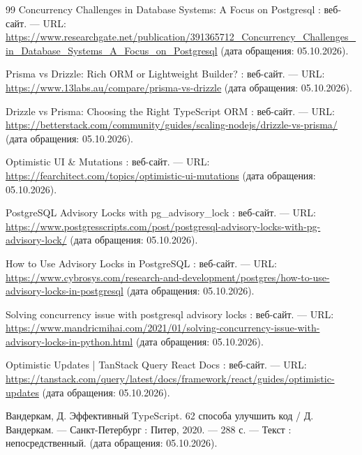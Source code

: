 \documentclass[a4paper,14pt]{extreport}
\begin{document}
\begin{thebibliography}{99}
 Concurrency Challenges in Database Systems: A Focus on Postgresql : веб-сайт. --- URL: \url{https://www.researchgate.net/publication/391365712_Concurrency_Challenges_in_Database_Systems_A_Focus_on_Postgresql} (дата обращения: 05.10.2026).

 Prisma vs Drizzle: Rich ORM or Lightweight Builder? : веб-сайт. --- URL: \url{https://www.13labs.au/compare/prisma-vs-drizzle} (дата обращения: 05.10.2026).

 Drizzle vs Prisma: Choosing the Right TypeScript ORM : веб-сайт. --- URL: \url{https://betterstack.com/community/guides/scaling-nodejs/drizzle-vs-prisma/} (дата обращения: 05.10.2026).

 Optimistic UI \& Mutations : веб-сайт. --- URL: \url{https://fearchitect.com/topics/optimistic-ui-mutations} (дата обращения: 05.10.2026).

 PostgreSQL Advisory Locks with pg\_advisory\_lock : веб-сайт. --- URL: \url{https://www.postgresscripts.com/post/postgresql-advisory-locks-with-pg-advisory-lock/} (дата обращения: 05.10.2026).

 How to Use Advisory Locks in PostgreSQL : веб-сайт. --- URL: \url{https://www.cybrosys.com/research-and-development/postgres/how-to-use-advisory-locks-in-postgresql} (дата обращения: 05.10.2026).

 Solving concurrency issue with postgresql advisory locks : веб-сайт. --- URL: \url{https://www.mandricmihai.com/2021/01/solving-concurrency-issue-with-advisory-locks-in-python.html} (дата обращения: 05.10.2026).

 Optimistic Updates | TanStack Query React Docs : веб-сайт. --- URL: \url{https://tanstack.com/query/latest/docs/framework/react/guides/optimistic-updates} (дата обращения: 05.10.2026).

 Вандеркам, Д. Эффективный TypeScript. 62 способа улучшить код / Д. Вандеркам. — Санкт-Петербург : Питер, 2020. — 288 с. — Текст : непосредственный. (дата обращения: 05.10.2026).

\end{thebibliography}
\end{document}
